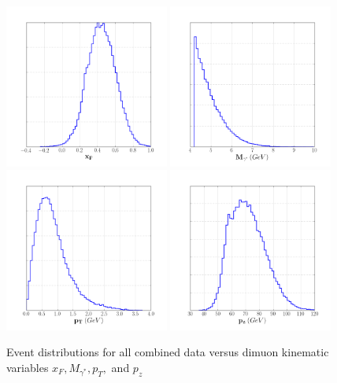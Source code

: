 \begin{figure}
	\centering
	\includegraphics[width=0.48\textwidth]{figures/results/xF-dist.png} \hfill
	\includegraphics[width=0.48\textwidth]{figures/results/mass-dist.png}    
	\includegraphics[width=0.48\textwidth]{figures/results/pt-dist.png} \hfill
	\includegraphics[width=0.48\textwidth]{figures/results/pz-dist.png} \\
	\caption{Event distributions for all combined data versus dimuon kinematic variables $x_F, M_{\gamma^*}, p_T,$ and $p_z$}
	\label{fig:event-dist1}
\end{figure}

